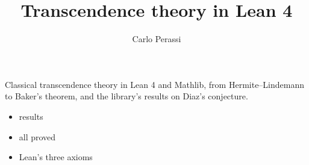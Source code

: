 \documentclass{report}
\title{Transcendence theory in Lean 4}
\author{Carlo Perassi}
\begin{document}
\maketitle

Classical transcendence theory in Lean 4 and Mathlib, from Hermite--Lindemann to Baker's theorem, and the library's results on Diaz's conjecture.

\begin{itemize}
\item \blueprintresults{} results
\item all proved
\item Lean's three axioms
\end{itemize}


\end{document}
